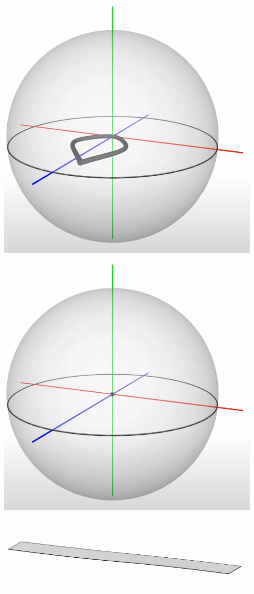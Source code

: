 \documentclass[10pt]{beamer}
\begin{document}
\begin{frame}
    \includegraphics[scale=0.1]{Pictures/4pisphere3.png}

    \includegraphics[scale=0.1]{Pictures/4pisphere4.png}

    \includegraphics[scale=0.1]{Pictures/flatbelt.png}

\end{frame}
\end{document}
